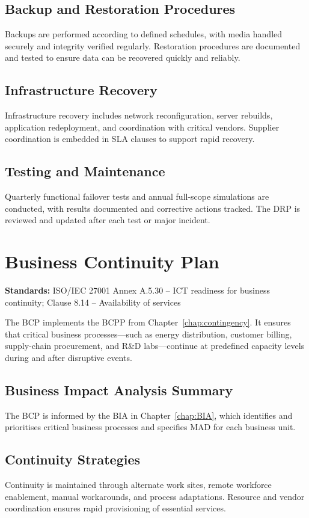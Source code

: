 \subsection{Backup and Restoration Procedures}
Backups are performed according to defined schedules, with media handled securely and integrity verified regularly. Restoration procedures are documented and tested to ensure data can be recovered quickly and reliably.

\subsection{Infrastructure Recovery}
Infrastructure recovery includes network reconfiguration, server rebuilds, application redeployment, and coordination with critical vendors. Supplier coordination is embedded in SLA clauses to support rapid recovery.

\subsection{Testing and Maintenance}
Quarterly functional failover tests and annual full-scope simulations are conducted, with results documented and corrective actions tracked. The \ac{DRP} is reviewed and updated after each test or major incident.

\section{Business Continuity Plan}
\label{sec:BCP_plan}
\textbf{Standards:} ISO/IEC 27001 Annex A.5.30 – ICT readiness for business continuity; Clause 8.14 – Availability of services

The \ac{BCP} implements the \ac{BCPP} from Chapter~\ref{chap:contingency}. It ensures that critical business processes—such as energy distribution, customer billing, supply-chain procurement, and R\&D labs—continue at predefined capacity levels during and after disruptive events.

\subsection{Business Impact Analysis Summary}
The \ac{BCP} is informed by the \ac{BIA} in Chapter~\ref{chap:BIA}, which identifies and prioritises critical business processes and specifies \ac{MAD} for each business unit.

\subsection{Continuity Strategies}
Continuity is maintained through alternate work sites, remote workforce enablement, manual workarounds, and process adaptations. Resource and vendor coordination ensures rapid provisioning of essential services.


